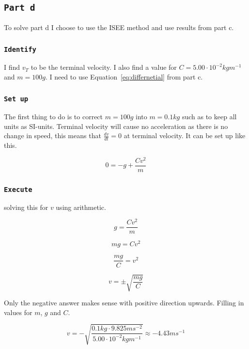 \documentclass{article}
\let\oldsubsection\subsection
\renewcommand{\subsection}[1]{%
  \oldsubsection{\texttt{#1}}%
  \setcounter{subsubsection}{-1}%
}
\let\oldsubsubsection\subsubsection
\renewcommand{\subsubsection}[1]{%
  \oldsubsubsection{\texttt{#1}}%
}
\begin{document}
\clearpage
\subsection{Part d}
To solve part d I choose to use the ISEE method and use results from part c.

\subsubsection{Identify}
I find \(v_T\) to be the terminal velocity. I also find a value for \(C = 5.00 \cdot 10^{-2} kgm^{-1}\) and \(m = 100g\). I need to use Equation~\ref{eq:differnetial} from part c.

\subsubsection{Set up}
The first thing to do is to correct \(m = 100g\) into \(m = 0.1kg\) such as to keep all units as SI-units. Terminal velocity will cause no acceleration as there is no change in speed, this means that \(\frac{dv}{dt}=0\) at terminal velocity. It can be set up like this.

\begin{equation*}
    0 = - g + \frac{Cv^2}{m}
\end{equation*}

\subsubsection{Execute}
solving this for \(v\) using arithmetic.

\begin{equation*}
    g = \frac{Cv^2}{m}
\end{equation*}

\begin{equation*}
    mg = Cv^2
\end{equation*}

\begin{equation*}
    \frac{mg}{C} = v^2
\end{equation*}

\begin{equation}
    v = \pm\sqrt{\frac{mg}{C}}
    \label{eq:v_terminal}
\end{equation}

Only the negative answer makes sense with positive direction upwards. Filling in values for \(m\), \(g\) and \(C\).

\begin{equation}
    v = -\sqrt{\frac{0.1kg \cdot 9.825 ms^{-2}}{5.00 \cdot10^{-2}kgm^{-1}}} \approx -4.43ms^{-1}
    \label{eq:v_terminal_sphere}
\end{equation}
\end{document}
